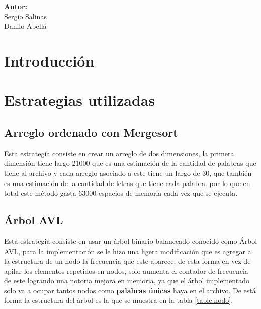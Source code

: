 \documentclass[12pt,letterpaper]{scrartcl}
\begin{document}
\begin{titlepage}
\begin{center}
\begin{minipage}[l]{0.4\textwidth}
	\begin{flushright}

		\textbf{\textsf{Autor:}}\\
		\linespread{1}
		\large Sergio Salinas\\
		\large Danilo Abellá\\

	\end{flushright}
\end{minipage}

\end{center}

\end{titlepage}



\newpage

\tableofcontents

 \newpage
\section{Introducción} 

\section{Estrategias utilizadas}

\subsection{Arreglo ordenado con Mergesort}

Esta estrategia consiste en crear un arreglo de dos dimensiones, la primera dimensión tiene largo 21000 que es una estimación de la cantidad de palabras que tiene al archivo y cada arreglo asociado a este tiene un largo de 30, que también es una estimación de la cantidad de letras que tiene cada palabra. por lo que en total este método gasta 63000 espacios de memoria cada vez que se ejecuta.

\subsection{Árbol AVL}

Esta estrategia consiste en usar un árbol binario balanceado conocido como Árbol AVL, para la implementación se le hizo una ligera modificación que es agregar a la estructura de un nodo la frecuencia que este aparece, de esta forma en vez de apilar los elementos repetidos en nodos, solo aumenta el contador de frecuencia de este logrando una notoria mejora en memoria, ya que el árbol implementado solo va a ocupar tantos nodos como \textbf{palabras únicas} haya en el archivo. De está forma la estructura del árbol es la que se muestra en la tabla \ref{table:nodo}.
\end{document}

